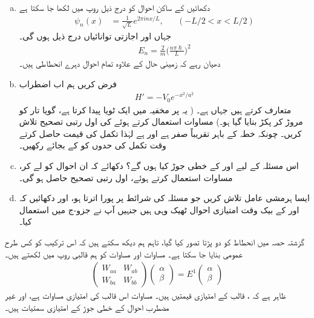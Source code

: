 \begin{enumerate}[a.]
\item
دکھائیں کے ساکن احوال کو درج ذیل روپ میں لکھا جا سکتا ہے 
 \begin{align*}
\psi_n (x) &= \frac{1}{\sqrt{L}} e^{2 \pi i n x/ L}, &&(-L/2 < x < L/2)
\end{align*}
جہاں  اور اجازتی توانائیاں درج ذیل ہوں گی۔
\begin{align*}
E_n = \frac{2}{m} \big ( \frac{n \pi \hslash}{L} \big )^2
\end{align*}
دھیان رہے کہ زمینی حال  کے علاوہ تمام احوال دہرے انحطاطی ہیں۔ 
\item
فرض کریں ہم اب اضطراب 
\begin{align*}
H' = -V_0 e^{-x^2 / a^2}
\end{align*}
متعارف کرتے ہیں جہاں  ہے۔ ( یہ  پر مخفیہ میں ایک ٹویا پیدا کرتا ہے، گویا تار کو مروڑ کر پکڑ بنایا گیا ہو۔) مساوات  استعمال کرتے ہوئے  کی اول رتبی تصحیح تلاش کریں۔  چونکہ  خطہ  کے باہر تقریباً صفر ہے اور  ہے لہٰذا تکمل کی قیمت حاصل کرتے وقت تکمل کی حدوں کو  کے بجائے  رکھیں۔
\item
اس مسئلہ کے لیے  اور  کے  خطی جوڑ کیا ہوں گے؟ دکھائے کہ ان احوال کو لے کر، مساوات  استعمال کرتے ہوئے، اول رتبی تصحیح حاصل ہو گی۔ 
\item
ایسا ہرمشی عامل  تلاش کریں جو مسئلہ کی شرائط پر پورا اترتا ہو، اور دکھائیں کہ  اور  کے بیک وقت امتیازی احوال ٹھیک وہی ہیں جنہیں آپ نے جزو-ج میں استعمال کیا۔
\end{enumerate}


گزشتہ حصہ میں انحطاط کو دو پڑتا تصور کیا گیا، تاہم ہم دیکھ سکتے ہیں کہ اس ترکیب کو کس طرح عمومی بنایا جا سکتا ہے۔ مساوات  اور مساوات  کو ہم قالبی روپ میں لکھتے ہیں۔ 
\begin{align}
\begin{pmatrix} 
W_{aa} & W_{ab} \\
W_{ba} & W_{bb}
\end{pmatrix}
\begin{pmatrix}
\alpha \\
\beta
\end{pmatrix}
= E^1
\begin{pmatrix}
\alpha \\
\beta
\end{pmatrix}
\end{align}
ظاہر ہے کہ  ، قالب کے امتیازی قیمتیں ہیں۔ مساوات  اس قالب کی امتیازی مساوات ہے، اور غیر مضطرب احوال کے  خطی جوڑ  کے امتیازی سمتیات ہیں۔

